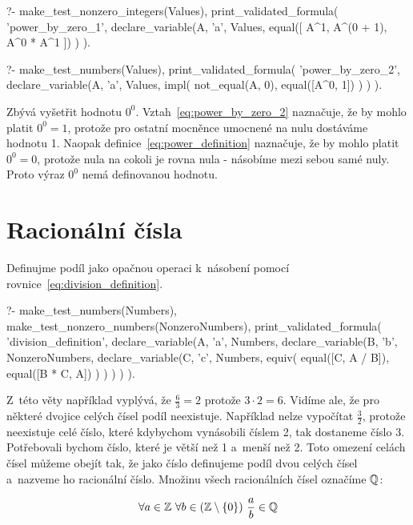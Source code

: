 \begin{prolog}
?-	make_test_nonzero_integers(Values),
	print_validated_formula(
		'power_by_zero_1',
		declare_variable(A, 'a', Values,
			equal([
				A^1,
				A^(0 + 1),
				A^0 * A^1
			])
		)
	).
\end{prolog}
\begin{prolog}
?-	make_test_numbers(Values),
	print_validated_formula(
		'power_by_zero_2',
		declare_variable(A, 'a', Values,
			impl(
				not_equal(A, 0),
				equal([A^0, 1])
			)
		)
	).
\end{prolog}

Zbývá vyšetřit hodnotu \(0^0\). Vztah~\eqref{eq:power_by_zero_2} naznačuje, že by mohlo platit \(0^0 = 1\), protože pro ostatní mocněnce umocnené na nulu dostáváme hodnotu 1. Naopak definice~\eqref{eq:power_definition} naznačuje, že by mohlo platit \(0^0 = 0\), protože nula na cokoli je rovna nula - násobíme mezi sebou samé nuly. Proto výraz \(0^0\) nemá definovanou hodnotu.

\section{Racionální čísla}

Definujme podíl jako opačnou operaci k~násobení pomocí rovnice~\eqref{eq:division_definition}.

\begin{prolog}
?-	make_test_numbers(Numbers),
	make_test_nonzero_numbers(NonzeroNumbers),
	print_validated_formula(
		'division_definition',
		declare_variable(A, 'a', Numbers,
			declare_variable(B, 'b', NonzeroNumbers,
				declare_variable(C, 'c', Numbers,
					equiv(
						equal([C, A / B]),
						equal([B * C, A])
					)
				)
			)
		)
	).
\end{prolog}

Z~této věty například vyplývá, že \(\frac{6}{3} = 2\) protože \(3 \cdot 2 = 6\). Vidíme ale, že pro některé dvojice celých čísel podíl neexistuje. Například nelze vypočítat \(\frac{3}{2}\), protože neexistuje celé číslo, které kdybychom vynásobili číslem 2, tak dostaneme číslo 3. Potřebovali bychom číslo, které je větší než 1 a~menší než 2. Toto omezení celách čísel můžeme obejít tak, že jako číslo definujeme podíl dvou celých čísel a~nazveme ho racionální číslo. Množinu všech racionálních čísel označíme \(\mathbb{Q}\):

\begin{equation}
\forall a \in \mathbb{Z} \ \forall b \in (\mathbb{Z} \setminus \{0\}) \ \frac{a}{b} \in \mathbb{Q}
\end{equation}

